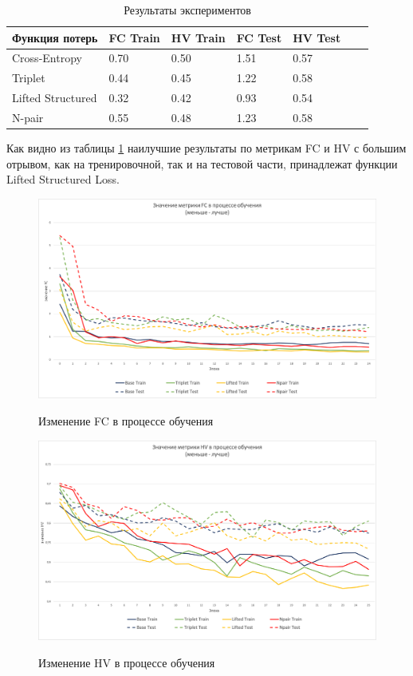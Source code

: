 \begin{table}[!h]
\centering
\begin{tabular}{|p{3.5 cm}|p{1.5 cm}|p{1.5 cm}|p{1.2 cm}|p{1.2 cm}|p{1.8 cm}|p{1.8 cm}|}
\hline
Функция потерь    & FC Train & HV Train & FC Test & HV Test  \\ \hline
Cross-Entropy     & 0.70     & 0.50     & 1.51    & 0.57     \\ \hline
Triplet           & 0.44     & 0.45     & 1.22    & 0.58     \\ \hline
Lifted Structured & 0.32     & 0.42     & 0.93    & 0.54     \\ \hline
N-pair            & 0.55     & 0.48     & 1.23    & 0.58     \\ \hline         
\end{tabular}
\caption{Результаты экспериментов}
\label{table:1}
\end{table}

Как видно из таблицы \ref{table:1} наилучшие результаты по метрикам FC и HV с большим отрывом, как на тренировочной, так и на тестовой части, принадлежат функции Lifted Structured Loss.

\begin{figure}[!h]
\caption{Изменение FC в процессе обучения}
\centering
\includegraphics[width=16cm]{Images/FC_aggregate.png}
\label{fig:FC_aggregate}
\end{figure}

\begin{figure}[!h]
\caption{Изменение HV в процессе обучения}
\centering
\includegraphics[width=16cm]{Images/HV_aggregate.png}
\label{fig:HV_aggregate}
\end{figure}

